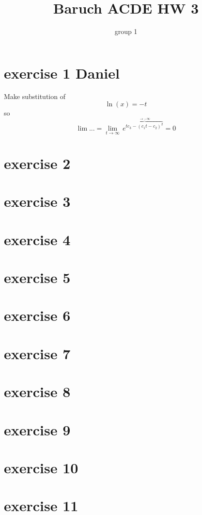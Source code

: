 \documentclass{article}
\title{Baruch ACDE HW 3}
\author{group 1}
\begin{document}
\maketitle
\tableofcontents

\section{exercise 1 Daniel}
Make substitution of \[\ln \left( x \right)=-t\] so
\[\lim ...=\underset{t\to \infty }{\mathop{\lim }}\,{{e}^{\overbrace{t{{c}_{3}}-{{\left( {{c}_{1}}t-{{c}_{2}} \right)}^{2}}}^{\to -\infty }}}=0\]

\section{exercise 2}

\section{exercise 3}

\section{exercise 4}

\section{exercise 5}
\section{exercise 6}
\section{exercise 7}
\section{exercise 8}
\section{exercise 9}
\section{exercise 10}
\section{exercise 11}
\end{document}
